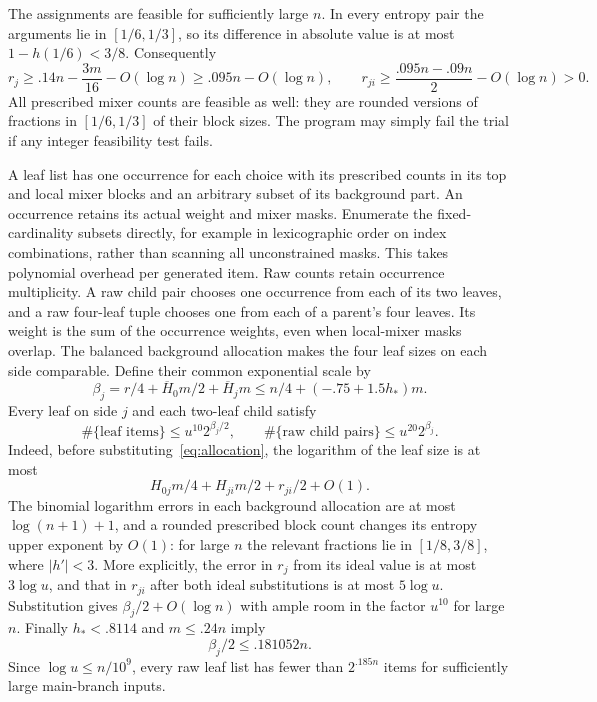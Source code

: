 The assignments are feasible for sufficiently large $n$.  In every
entropy pair the arguments lie in $[1/6,1/3]$, so its difference in
absolute value is at most $1-h(1/6)<3/8$.  Consequently
\[
 r_j\ge .14n-\frac{3m}{16}-O(\log n)
       \ge .095n-O(\log n),
 \qquad
 r_{ji}\ge \frac{.095n-.09n}{2}-O(\log n)>0.
\]
All prescribed mixer counts are feasible as well: they are rounded
versions of fractions in $[1/6,1/3]$ of their block sizes.  The program
may simply fail the trial if any integer feasibility test fails.

A leaf list has one occurrence for each choice with its prescribed
counts in its top and local mixer blocks and an arbitrary subset of its
background part.  An occurrence retains its actual weight and mixer
masks.  Enumerate the fixed-cardinality subsets directly, for example in
lexicographic order on index combinations, rather than scanning all
unconstrained masks.  This takes polynomial overhead per generated item.
Raw counts retain occurrence multiplicity. A raw child pair chooses
one occurrence from each of its two leaves, and a raw four-leaf tuple
chooses one from each of a parent's four leaves. Its weight is the sum
of the occurrence weights, even when local-mixer masks overlap.
The balanced background allocation makes the four leaf sizes on each
side comparable. Define their common exponential scale by
\begin{equation}\label{eq:beta}
 \beta_j=r/4+\overline H_0m/2+\overline H_jm
 \le n/4+(-.75+1.5h_*)m.
\end{equation}
Every leaf on side $j$ and each two-leaf child satisfy
\begin{equation}\label{alg:leaf-size}
 \#\{\text{leaf items}\}\le u^{10}2^{\beta_j/2},
 \qquad
 \#\{\text{raw child pairs}\}\le u^{20}2^{\beta_j}.
\end{equation}
Indeed, before substituting~\eqref{eq:allocation}, the logarithm of the
leaf size is at most
\[
 H_{0j}m/4+H_{ji}m/2+r_{ji}/2+O(1).
\]
The binomial logarithm errors in each background allocation are at most
$\log(n+1)+1$, and a rounded prescribed block count changes its entropy
upper exponent by $O(1)$: for large $n$ the relevant fractions lie in
$[1/8,3/8]$, where $|h'|<3$.  More explicitly, the error in $r_j$ from
its ideal value is at most $3\log u$, and that in $r_{ji}$ after both
ideal substitutions is at most $5\log u$.  Substitution gives
$\beta_j/2+O(\log n)$ with ample room in the factor $u^{10}$ for large
$n$.  Finally $h_*<.8114$ and $m\le .24n$ imply
\[
 \beta_j/2\le .181052n.
\]
Since $\log u\le n/10^9$, every raw leaf list has fewer than
$2^{.185n}$ items for sufficiently large main-branch inputs.

